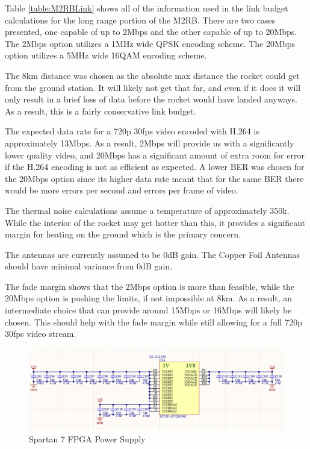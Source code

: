 \documentclass[crop=false]{standalone}
\begin{document}
        Table \ref{table:M2RBLink} shows all of the information used in the link budget calculations for the long range portion of the M2RB. There are two cases presented, one capable of up to 2Mbps and the other capable of up to 20Mbps. The 2Mbps option utilizes a 1MHz wide QPSK encoding scheme. The 20Mbps option utilizes a 5MHz wide 16QAM encoding scheme.
            
        The 8km distance was chosen as the absolute max distance the rocket could get from the ground station. It will likely not get that far, and even if it does it will only result in a brief loss of data before the rocket would have landed anyways. As a result, this is a fairly conservative link budget.
            
        The expected data rate for a 720p 30fps video encoded with H.264 is approximately 13Mbps. As a result, 2Mbps will provide us with a significantly lower quality video, and 20Mbps has a significant amount of extra room for error if the H.264 encoding is not as efficient as expected. A lower BER was chosen for the 20Mbps option since its higher data rate meant that for the same BER there would be more errors per second and errors per frame of video.

        The thermal noise calculations assume a temperature of approximately 350k. While the interior of the rocket may get hotter than this, it provides a significant margin for heating on the ground which is the primary concern.
            
        The antennas are currently assumed to be 0dB gain. 
        The Copper Foil Antennas  should have minimal variance from 0dB gain.
            
        The fade margin shows that the 2Mbps option is more than feasible, while the 20Mbps option is pushing the limits, if not impossible at 8km. As a result, an intermediate choice that can provide around 15Mbps or 16Mbps will likely be chosen. This should help with the fade margin while still allowing for a full 720p 30fps video stream.
            
        \begin{figure}[H]
            \centering
            \includegraphics[width=\textwidth]{FPGAPower.PNG}
            \caption{Spartan 7 FPGA Power Supply}
            \label{fig:FPGAPower}
        \end{figure}
            
\end{document}
